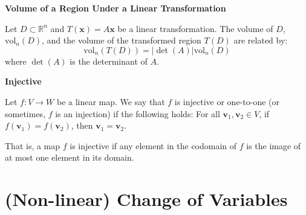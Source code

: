 \documentclass{article}
\newcommand{\R}{\mathbb{R}}
\newenvironment{definition}[1]{
    \par\noindent\textbf{#1}\par\noindent
}{
    \par \vspace{0.5cm}
}
\begin{document}
\begin{definition}{Volume of a Region Under a Linear Transformation}
Let \( D \subset \R^n \) and \( T(\bm{x}) = A\bm{x} \) be a linear transformation. The volume of \( D \), \( \text{vol}_n(D) \), and the volume of the transformed region \( T(D) \) are related by:
\[
\text{vol}_n(T(D)) = \left| \det(A) \right| \text{vol}_n(D)
\]
where \( \det(A) \) is the determinant of \( A \).
\end{definition}

\noindent \textbf{Injective}

Let \( f: V \rightarrow W \) be a linear map. We say that \( f \) is injective or one-to-one (or sometimes, \( f \) is an injection) if the following holds:
For all \( \bm{v}_1, \bm{v}_2 \in V \), if \( f(\bm{v}_1) = f(\bm{v}_2) \), then \( \bm{v}_1 = \bm{v}_2 \).

That is, a map \( f \) is injective if any element in the codomain of \( f \) is the image of at most one element in its domain.

\begin{center}
\end{center}

\vspace{0.5cm}

\section*{(Non-linear) Change of Variables}
\end{document}
